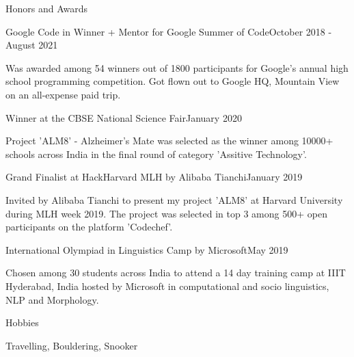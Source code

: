 \documentclass[
	a4paper, %
	11pt, %
]{resume} %
\begin{document}
\begin{rSection}{Honors and Awards}

	\begin{achSubsection}{Google Code in Winner + Mentor for Google Summer of Code}{October 2018 - August 2021}
		\item Was awarded among 54 winners out of 1800 participants for Google's annual high school programming competition. Got flown out to Google HQ, Mountain View on an all-expense paid trip.
	\end{achSubsection}


	\begin{achSubsection}{Winner at the CBSE National Science Fair}{January 2020}
		\item Project 'ALM8' - Alzheimer's Mate was selected as the winner among 10000+ schools across India in the final round of category 'Assitive Technology'.
	\end{achSubsection}


	\begin{achSubsection}{Grand Finalist at HackHarvard MLH by Alibaba Tianchi}{January 2019}
		\item Invited by Alibaba Tianchi to present my project 'ALM8' at Harvard University during MLH week 2019. The project was selected in top 3 among 500+ open participants on the platform 'Codechef'.
	\end{achSubsection}


	\begin{achSubsection}{International Olympiad in Linguistics Camp by Microsoft}{May 2019}
		\item Chosen among 30 students across India to attend a 14 day training camp at IIIT Hyderabad, India hosted by Microsoft in computational and socio linguistics, NLP and Morphology.
	\end{achSubsection}

\end{rSection}

\begin{rSection}{Hobbies}

	Travelling, Bouldering, Snooker


\end{rSection}
\end{document}
